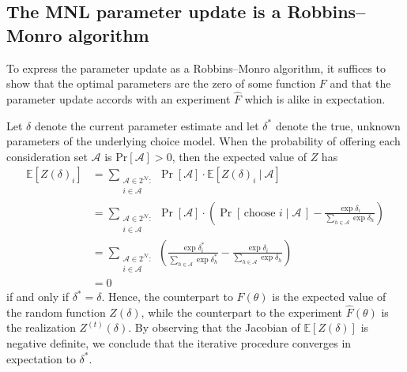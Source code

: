 \documentclass[preprint,12pt,authoryear]{elsarticle}
\begin{document}

\subsection{The MNL parameter update is a Robbins--Monro algorithm}
To express the parameter update as a Robbins--Monro algorithm, it suffices to show that the optimal parameters are the zero of some function $F$ and that the parameter update accords with an experiment $\hat F$ which is alike in expectation.  

Let $\delta$ denote the current parameter estimate and let $\delta^*$ denote the true, unknown parameters of the underlying choice model. When the probability of offering each consideration set $\mathcal{A}$ is $\operatorname{Pr[\mathcal{A}]} > 0$, then the expected value of $Z$ has
\begin{align}
\mathbb{E}\left[Z(\delta)_i \right] &= \sum_{\substack{\mathcal{A} \in 2^{\mathcal{N}}: \\ i \in \mathcal{A}}}\operatorname{Pr}\left[\mathcal{A}\right] \cdot \mathbb{E}\left[Z(\delta)_i~|~\mathcal{A}\right] \\
&=   \sum_{\substack{\mathcal{A} \in 2^{\mathcal{N}}: \\ i \in \mathcal{A}}}\operatorname{Pr}\left[\mathcal{A}\right] \cdot \left(\operatorname{Pr}\left[\,\text{choose } i\;|\;\mathcal{A}\,\right] - \frac{\exp \delta_i}{\sum_{h\in \mathcal{A}} \exp \delta_h} \right) \\
&= \sum_{\substack{\mathcal{A} \in 2^{\mathcal{N}}: \\ i \in \mathcal{A}}}\left(\frac{\exp  \delta_i^*}{\sum_{h\in \mathcal{A}} \exp \delta_h^*} - \frac{\exp \delta_i}{\sum_{h\in \mathcal{A}} \exp \delta_h} \right) \\
&= 0
\end{align}
if and only if $\delta^* = \delta$. Hence, the counterpart to $F(\theta)$ is the expected value of the random function $Z(\delta)$, while the counterpart to the experiment $\hat F(\theta)$ is the realization $Z^{(t)}(\delta)$. By observing that the Jacobian of $\mathbb{E}\left[Z(\delta) \right]$ is negative definite, we conclude that the iterative procedure converges in expectation to $\delta^*$. 
\end{document}
